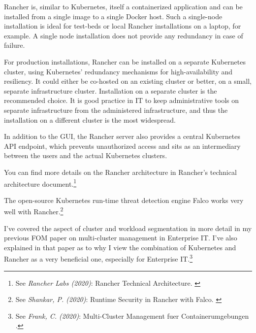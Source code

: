 Rancher is, similar to Kubernetes, itself a containerized application and can be installed from a single image to a single Docker host. Such a single-node installation is ideal for test-beds or local Rancher installations on a laptop, for example. A single node installation does not provide any redundancy in case of failure.

For production installations, Rancher can be installed on a separate Kubernetes cluster, using Kubernetes' redundancy mechanisms for high-availability and resiliency. It could either be co-hosted on an existing cluster or better, on a small, separate infrastructure cluster. Installation on a separate cluster is the recommended choice. It is good practice in IT to keep administrative tools on separate infrastructure from the administered infrastructure, and thus the installation on a different cluster is the most widespread.

In addition to the GUI, the Rancher server also provides a central Kubernetes API endpoint, which prevents unauthorized access and sits as an intermediary between the users and the actual Kubernetes clusters.

You can find more details on the Rancher architecture in Rancher's technical architecture document.\footnote{See \textit{Rancher Labs (2020)}: Rancher Technical Architecture. \cite{technicalArchitecture}}

The open-source Kubernetes run-time threat detection engine Falco works very well with Rancher.\footnote{See \textit{Shankar, P. (2020)}: Runtime Security in Rancher with Falco. \cite{falcoPsp}}

I've covered the aspect of cluster and workload segmentation in more detail in my previous FOM paper on multi-cluster management in Enterprise IT. I've also explained in that paper as to why I view the combination of Kubernetes and Rancher as a very beneficial one, especially for Enterprise IT.\footnote{See \textit{Frank, C. (2020)}: Multi-Cluster Management fuer Containerumgebungen .\cite{previousPaper}} 
